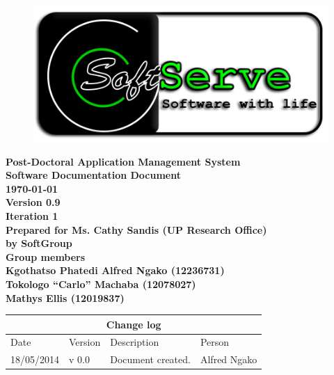 \documentclass[12pt]{article}
\newcommand{\Title}{Software Documentation Document} %
\newcommand{\ssr}{Soft\color{green}{Serve }\color{black}}
\newcommand{\version}{0.9}
\newcommand{\iteration}{1}
\newcommand{\client}{Ms. Cathy Sandis (UP Research Office)}
\newcommand{\project}{Post-Doctoral Application Management System}
\begin{document}
\vspace{4em}

\begin{center}%

\begin{figure}[ht!]
\centering
\includegraphics{../Images_Docs/logo.png}
\end{figure}
\LARGE \bf \project \\[1em]
\LARGE \bf \Title \\[0.25em]
\large \bf \today\\
\bf Version \version\\
\bf Iteration \iteration\\[0.5em]
\Large \bf Prepared for \client\\
\Large \bf by
\Large {\bf \ssr Group }\\[0.5em]
\LARGE {\bf Group members}\\[0.25em]
\large
Kgothatso Phatedi Alfred Ngako (12236731) \\[0.5em]
Tokologo “Carlo” Machaba (12078027) \\[0.5em]
Mathys Ellis (12019837) \\[8em]

\end{center}%


\begin{center}
\begin{tabular}{|l|p{1.4cm}|p{8cm}|p{2.8cm}|}
\hline
\multicolumn{4}{|c|}{\bf Change log} \\
\hline
 Date & Version & Description &  Person \\
\hline
18/05/2014 & v 0.0 & Document created. & Alfred Ngako \\
\hline
\end{tabular}
\end{center}
\newpage
\tableofcontents
\end{document}
